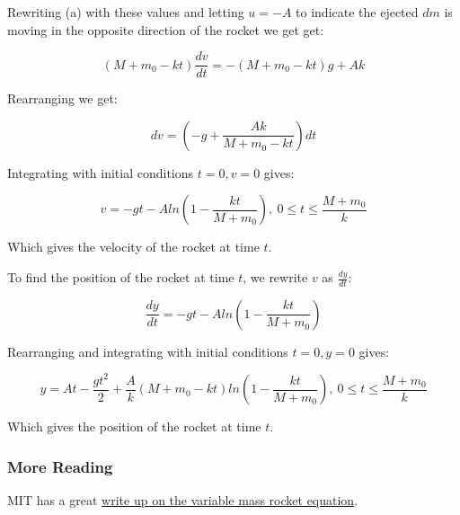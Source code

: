 \documentclass{article}
\begin{document}
Rewriting (a) with these values and letting $u = -A$ to indicate the ejected $dm$ is moving in the opposite direction of the rocket we get  get:

\[ (M + m_0 -kt)\frac{dv}{dt} = -(M+m_0-kt)g + Ak \tag{b} \]

Rearranging we get:

\[ dv = (-g + \frac{Ak}{M+m_0-kt})dt \tag{c} \]

Integrating with initial conditions $t = 0, v=0$ gives:

\[ v = -gt -Aln(1-\frac{kt}{M+m_0}),~0 \leq t \leq \frac{M+m_0}{k} \tag{d} \]

Which gives the velocity of the rocket at time $t$.

To find the position of the rocket at time $t$, we rewrite $v$ as $\frac{dy}{dt}$:

\[ \frac{dy}{dt} = -gt -Aln(1-\frac{kt}{M+m_0}) \tag{e} \]

Rearranging and integrating with initial conditions $t = 0, y =0$ gives:

\[ y = At - \frac{gt^2}{2} + \frac{A}{k}(M+m_0-kt)ln(1-\frac{kt}{M+m_0}), ~0 \leq t \leq \frac{M+m_0}{k} \tag{f} \]

Which gives the position of the rocket at time $t$.

\subsubsection{More Reading}

MIT has a great \href{https://ocw.mit.edu/courses/16-07-dynamics-fall-2009/98d19cb2b9983c14c6907052499e7a98_MIT16_07F09_Lec14.pdf}{write up on the variable mass rocket equation}.
\end{document}
